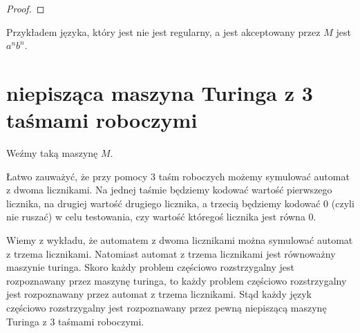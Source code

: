 \documentclass{article}
\theoremstyle{definition}
\theoremstyle{remark}
\begin{document}
\begin{proof}
\end{proof}

Przykładem języka, który jest nie jest regularny, a jest akceptowany przez \(M\) jest $a^n b^n$.

\section{niepisząca maszyna Turinga z 3 taśmami roboczymi}
Weźmy taką maszynę \(M\).

Łatwo zauważyć, że przy pomocy 3 taśm roboczych możemy symulować automat z dwoma licznikami.
Na jednej taśmie będziemy kodować wartość pierwszego licznika, na drugiej wartość drugiego licznika, 
a trzecią będziemy kodować 0 (czyli nie ruszać) w celu testowania, czy wartość któregoś licznika jest równa 0.

Wiemy z wykładu, że automatem z dwoma licznikami można symulować automat z trzema licznikami.
Natomiast automat z trzema licznikami jest równoważny maszynie turinga.
Skoro każdy problem częściowo rozstrzygalny jest rozpoznawany przez maszynę turinga, to każdy problem częściowo rozstrzygalny jest rozpoznawany przez automat z trzema licznikami.
Stąd każdy język częściowo rozstrzygalny jest rozpoznawany przez pewną niepiszącą maszynę Turinga z 3 taśmami roboczymi.
\end{document}
